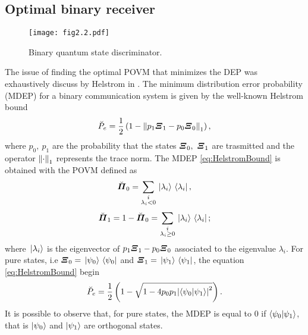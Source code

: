     \subsection{Optimal binary receiver}
    \begin{figure}[t]
        \begin{center}
            \texttt{[image: fig2.2.pdf]}
            \caption{Binary quantum state discriminator.}
            \label{fig:2.2}
        \end{center}
    \end{figure}
    The issue of finding the optimal POVM that minimizes the DEP was exhaustively discuss  by Helstrom in 
    \cite{helstrom3,helstrom4}. The minimum distribution error probability (MDEP) for a binary 
    communication system is given by the well-known Helstrom bound
    \begin{equation}
        \breve{P}_e = \frac{1}{2} \left(1-\norm{p_1 \Operator{\varXi}_1 - p_0 \Operator{\varXi}_0}_1 \right),
        \label{eq:HelstromBound}
    \end{equation}
    where $p_0,\ p_1$ are the probability that the states $\Operator{\varXi}_0,\ \Operator{\varXi}_1$ are trasmitted
    and the operator $\norm{\cdot}_1$ represents the trace norm. 
    The MDEP \ref{eq:HelstromBound} is obtained with the POVM defined as
    \begin{equation}
        \breve{\Operator{\varPi}}_0 = \sum_{\substack{i \\ \lambda_i<0}} \ket*{\lambda_i}\bra*{\lambda_i},
    \end{equation}
    \begin{equation*}
        \breve{\Operator{\varPi}}_1 = 1-\breve{\Operator{\varPi}}_0 = 
        \sum_{\substack{i \\ \lambda_i \geq 0}} \ket*{\lambda_i}\bra*{\lambda_i};
    \end{equation*}
    where $\ket*{\lambda_i}$ is the eigenvector of $p_1 \Operator{\varXi}_1 - p_0 \Operator{\varXi}_0$ associated to 
    the eigenvalue $\lambda_i$.
    For pure states, i.e $\Operator{\varXi}_0 = \ket*{\psi_0}\bra*{\psi_0}$ and $\Operator{\varXi}_1 = \ket*{\psi_1}
    \bra*{\psi_1}$, the equation \ref{eq:HelstromBound} begin
    \begin{equation}
        \breve{P}_e = \frac{1}{2} \left(1- \sqrt{1-4 p_0 p_1 \absolutevalue{\braket{\psi_0}{\psi_1}}^2}
        \right).
        \label{eq:HelstromBPure}
    \end{equation}
    It is possible to observe that, for pure states, the MDEP is equal to $0$ if $\braket{\psi_0}{\psi_1}$,
    that is $\ket{\psi_0}$ and $\ket{\psi_1}$ are orthogonal states.